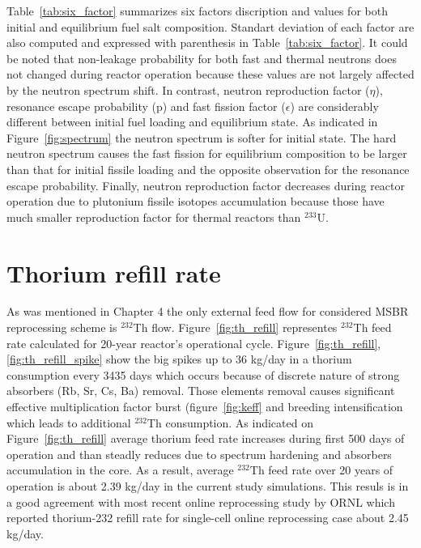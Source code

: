 Table~\ref{tab:six_factor} summarizes six factors discription and values for both initial and equilibrium fuel salt composition. Standart deviation of each factor are also computed and expressed with parenthesis in Table~\ref{tab:six_factor}. It could be noted that non-leakage probability for both fast and thermal neutrons does not changed during reactor operation because these values are not largely affected by the neutron spectrum shift. In contrast, neutron reproduction factor ($\eta$), resonance escape probability (p) and fast fission factor ($\epsilon$) are considerably different between initial fuel loading and equilibrium state. As indicated in Figure~\ref{fig:spectrum} the neutron spectrum is softer for initial state. The hard neutron spectrum causes the fast fission for equilibrium composition to be larger than that for initial fissile loading and the opposite observation for the resonance escape probability. Finally, neutron reproduction factor decreases during reactor operation due to plutonium fissile isotopes accumulation because those have much smaller reproduction factor for thermal reactors than $^{233}$U.

\section{Thorium refill rate}
As was mentioned in Chapter 4 the only external feed flow for considered \gls{MSBR} reprocessing scheme is $^{232}$Th flow. Figure~\ref{fig:th_refill} representes $^{232}$Th feed rate calculated for 20-year reactor's operational cycle. Figure~\ref{fig:th_refill}, \ref{fig:th_refill_spike} show the big spikes up to 36 kg/day in a thorium consumption every 3435 days which occurs because of discrete nature of strong absorbers (Rb, Sr, Cs, Ba) removal. Those elements removal causes significant effective multiplication factor burst (figure~\ref{fig:keff} and breeding intensification which leads to additional $^{232}$Th consumption. As indicated on Figure~\ref{fig:th_refill} average thorium feed rate increases during first 500 days of operation and than steadly reduces due to spectrum hardening and absorbers accumulation in the core. As a result, average $^{232}$Th feed rate over 20 years of operation is about 2.39 kg/day in the current study simulations. This resuls is in a good agreement with most recent online reprocessing study by \gls{ORNL} \cite{betzler_molten_2017} which reported thorium-232 refill rate for single-cell online reprocessing case about 2.45 kg/day.

